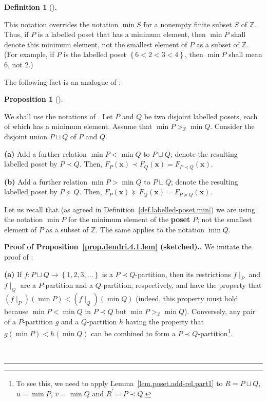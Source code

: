 \documentclass[numbers=enddot,12pt,final,onecolumn,notitlepage]{scrartcl}%
\theoremstyle{definition}
\newtheorem{prop}[theo]{Proposition}
\newenvironment{proposition}[1][]
{\begin{prop}[#1]\begin{leftbar}}
{\end{leftbar}\end{prop}}
\newtheorem{defi}[theo]{Definition}
\newenvironment{definition}[1][]
{\begin{defi}[#1]\begin{leftbar}}
{\end{leftbar}\end{defi}}
\newenvironment{proof}[1][Proof]{\noindent\textbf{#1.} }{\ \rule{0.5em}{0.5em}}
\newenvironment{verlong}{}{}
\newcommand{\ZZ}{\mathbb{Z}}
\begin{document}
\begin{verlong}
\begin{definition}
This notation overrides the notation $\min S$ for a nonempty
finite subset $S$ of $\ZZ$.
Thus, if $P$ is a labelled poset that has a minimum element,
then $\min P$ shall denote this minimum element,
not the smallest element of $P$ as a subset of $\ZZ$.
(For example, if $P$ is the labelled poset $\left\{6 < 2 < 3 < 4\right\}$,
then $\min P$ shall mean $6$, not $2$.)
\end{definition}

The following fact is an analogue of \cite[Lemma 5.2.17]{HopfComb}:

\begin{proposition}
\label{prop.dendri.4.1.lem}We shall use the notations of \cite[Section
5.2]{HopfComb}. Let $P$ and $Q$ be two disjoint labelled posets, each of which
has a minimum element. Assume that $\min P>_{\ZZ}\min Q$. Consider the
disjoint union $P\sqcup Q$ of $P$ and $Q$.

\textbf{(a)} Add a further relation $\min P<\min Q$ to $P\sqcup Q$; denote the
resulting labelled poset by $P\left.  \prec\right.  Q$. Then, $F_{P}\left(
\mathbf{x}\right)  \left.  \prec\right.  F_{Q}\left(  \mathbf{x}\right)
=F_{P\left.  \prec\right.  Q}\left(  \mathbf{x}\right)  $.

\textbf{(b)} Add a further relation $\min P>\min Q$ to $P\sqcup Q$; denote the
resulting labelled poset by $P\left.  \succeq\right.  Q$. Then, $F_{P}\left(
\mathbf{x}\right)  \left.  \succeq\right.  F_{Q}\left(  \mathbf{x}\right)
=F_{P\left.  \succeq\right.  Q}\left(  \mathbf{x}\right)  $.
\end{proposition}

Let us recall that (as agreed in Definition~\ref{def.labelled-poset.min})
we are using the notation $\min P$ for the minimum element
of the \textbf{poset} $P$; not the smallest element of $P$ as a subset
of $\ZZ$. The same applies to the notation $\min Q$.

\begin{proof}[Proof of Proposition~\ref{prop.dendri.4.1.lem} (sketched).]
We imitate the proof of \cite[Lemma 5.2.17]{HopfComb}:

\textbf{(a)} If $f : P \sqcup Q \to \left\{1,2,3,\ldots\right\}$ is a
$P \left. \prec \right. Q$-partition, then its restrictions $f\mid_P$
and $f\mid_Q$ are a $P$-partition and a $Q$-partition, respectively, and
have the property that
$\left(f\mid_P\right) \left( \min P \right) < \left(f\mid_Q\right) \left( \min Q \right)$
(indeed, this property must hold because $\min P < \min Q$ in
$P \left. \prec \right. Q$ but $\min P >_{\ZZ} \min Q$).
Conversely, any pair of a $P$-partition $g$ and a $Q$-partition $h$
having the property that $g \left(\min P\right) < h \left(\min Q\right)$
can be combined to form a
$P \left. \prec \right. Q$-partition\footnote{To see this, we need to
apply Lemma~\ref{lem.poset.add-rel.part1} to
$R = P \sqcup Q$, $u = \min P$, $v = \min Q$
and $R^{\prime} = P \left. \prec \right. Q$.}.


\end{proof}
\end{verlong}
\end{document}
